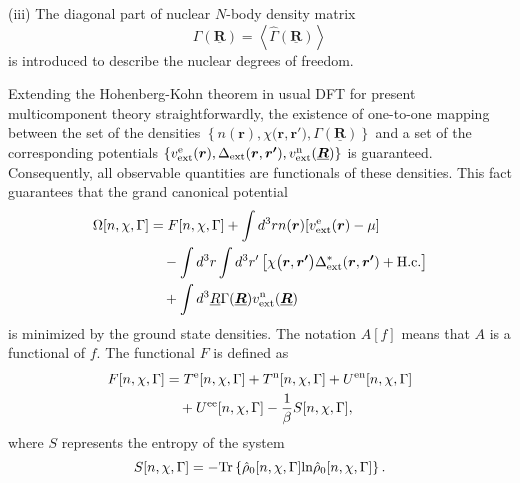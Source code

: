 (iii) The diagonal part of nuclear $N$-body density matrix
%
\begin{equation} %
	\Gamma(\underline{\bm{R}}) = \left<\hat{\Gamma}(\underline{\bm{R}}) \right>
\end{equation}
%
is introduced to describe the nuclear degrees of freedom.

Extending the Hohenberg-Kohn theorem in usual DFT\cite{HK1964,Mermin1965} for present multicomponent theory straightforwardly, 
the existence of one-to-one mapping between the set of the densities $ \left\{ n(\bm{r}), \chi \bigl(\bm{r}, \bm{r'} \bigr), 
\Gamma(\underline{\bm{R}}) \right\}$ and a set of the corresponding potentials 
$ \left\{ v^{\rm e}_{\rm ext}(\bm{r}), \Delta_\mathrm{ext}(\bm{r}, \bm{r'}), v^{\rm n}_{\rm ext}(\underline{\bm{R}}) \right\}$
is guaranteed\cite{HK1964, Mermin1965}.
Consequently, all observable quantities are functionals of these densities. 
This fact guarantees that the grand canonical potential 
%
\begin{equation}  %
\begin{split}
	\label{eq:grand_pot}
	\Omega[n, \chi, \Gamma] &= F[n, \chi, \Gamma] + \int d^3r n(\bm{r})[v^{\rm e}_{\rm ext}(\bm{r}) - \mu] \\
	                                    &\quad- \int d^3r \int d^3r' \left[\chi \bigl(\bm{r}, \bm{r'} \bigr)
	                                       \Delta^{\ast}_\mathrm{ext}(\bm{r}, \bm{r'}) + {\rm H.c.} \right]\\
	                     &\quad+ \int d^3\underline{R} \Gamma(\underline{\bm{R}})v^{\rm n}_{\rm ext}(\underline{\bm{R}})
\end{split}
\end{equation}
%
is minimized by the ground state densities. The notation $A[f]$ means that $A$ is a functional of $f$.
The functional $F$ is defined as
%
\begin{equation} %
\label{eq:Free_int}
\begin{split}
	F[n, \chi, \Gamma] &= T^{\rm e}[n, \chi, \Gamma] + T^{\rm n}[n, \chi, \Gamma] + U^{\rm en}[n, \chi, \Gamma] \\
	                                  &\quad + U^{\rm ee}[n, \chi, \Gamma] - \frac{1}{\beta}S[n, \chi, \Gamma],
\end{split}
\end{equation}
%
where $S$ represents the entropy of the system
%
\begin{equation}
	S[n, \chi, \Gamma] = -{\rm Tr}\left\{\hat{\rho}_0 [n, \chi, \Gamma]{\rm ln}\hat{\rho}_0 [n, \chi, \Gamma] \right\}.
\end{equation}
%

